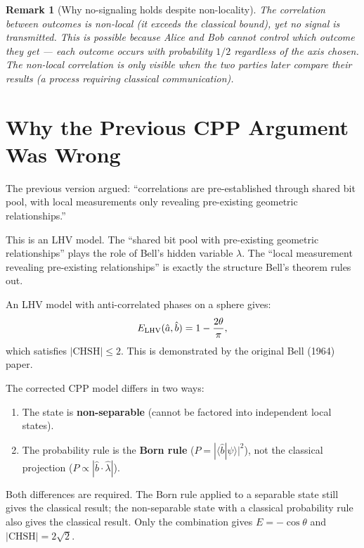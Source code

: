 \documentclass[11pt,a4paper]{article}
\newtheorem{remark}[theorem]{Remark}
\begin{document}
\begin{remark}[Why no-signaling holds despite non-locality]
The correlation between outcomes is non-local (it exceeds the classical
bound), yet no signal is transmitted.  This is possible because
Alice and Bob cannot \emph{control} which outcome they get ---
each outcome occurs with probability $1/2$ regardless of the axis
chosen.  The non-local correlation is only visible when the two
parties later \emph{compare} their results (a process requiring
classical communication).
\end{remark}

\section{Why the Previous CPP Argument Was Wrong}
\label{sec:previous}

The previous version argued: ``correlations are pre-established through
shared bit pool, with local measurements only revealing pre-existing
geometric relationships.''

This is an LHV model.  The ``shared bit pool with pre-existing
geometric relationships'' plays the role of Bell's hidden variable $\lambda$.
The ``local measurement revealing pre-existing relationships'' is exactly
the structure Bell's theorem rules out.

An LHV model with anti-correlated phases on a sphere gives:
\begin{equation}
E_{\rm LHV}(\hat{a},\hat{b}) = 1 - \frac{2\theta}{\pi},
\label{eq:classicalcorr}
\end{equation}
which satisfies $|\mathrm{CHSH}| \leq 2$.  This is demonstrated by the
original Bell (1964) paper.

The corrected CPP model differs in two ways:
\begin{enumerate}
\item The state is \textbf{non-separable} (cannot be factored into
  independent local states).
\item The probability rule is the \textbf{Born rule} ($P = |\langle\hat{b}
  |\psi\rangle|^2$), not the classical projection ($P \propto
  |\hat{b}\cdot\hat{\lambda}|$).
\end{enumerate}
Both differences are required.  The Born rule applied to a separable
state still gives the classical result; the non-separable state with
a classical probability rule also gives the classical result.  Only
the combination gives $E = -\cos\theta$ and $|\mathrm{CHSH}| = 2\sqrt{2}$.
\end{document}
